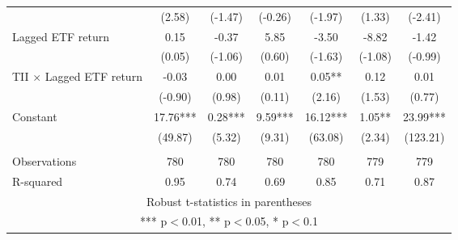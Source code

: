 \documentclass[]{article}
\begin{document}
\begin{tabular}{lcccccc}
 & (2.58) & (-1.47) & (-0.26) & (-1.97) & (1.33) & (-2.41) \\
Lagged ETF return & 0.15 & -0.37 & 5.85 & -3.50 & -8.82 & -1.42 \\
 & (0.05) & (-1.06) & (0.60) & (-1.63) & (-1.08) & (-0.99) \\
TII $\times$ Lagged ETF return & -0.03 & 0.00 & 0.01 & 0.05** & 0.12 & 0.01 \\
 & (-0.90) & (0.98) & (0.11) & (2.16) & (1.53) & (0.77) \\
Constant & 17.76*** & 0.28*** & 9.59*** & 16.12*** & 1.05** & 23.99*** \\
 & (49.87) & (5.32) & (9.31) & (63.08) & (2.34) & (123.21) \\
 &  &  &  &  &  &  \\
Observations & 780 & 780 & 780 & 780 & 779 & 779 \\
 R-squared & 0.95 & 0.74 & 0.69 & 0.85 & 0.71 & 0.87 \\ \hline
\multicolumn{7}{c}{ Robust t-statistics in parentheses} \\
\multicolumn{7}{c}{ *** p$<$0.01, ** p$<$0.05, * p$<$0.1} \\
\end{tabular}
\end{document}
